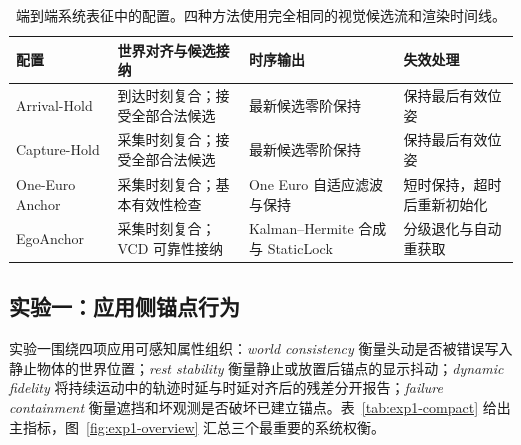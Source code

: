 \documentclass[9pt,twocolumn,letterpaper]{extarticle}
\begin{document}
\begin{table}[t]
\centering
\caption{端到端系统表征中的配置。四种方法使用完全相同的视觉候选流和渲染时间线。}
\label{tab:configs}
\small
\begin{tabularx}{\textwidth}{lXXX}
\toprule
配置 & 世界对齐与候选接纳 & 时序输出 & 失效处理 \\
\midrule
Arrival-Hold & 到达时刻复合；接受全部合法候选 & 最新候选零阶保持 & 保持最后有效位姿 \\
Capture-Hold & 采集时刻复合；接受全部合法候选 & 最新候选零阶保持 & 保持最后有效位姿 \\
One-Euro Anchor & 采集时刻复合；基本有效性检查 & One Euro 自适应滤波与保持 & 短时保持，超时后重新初始化 \\
EgoAnchor & 采集时刻复合；VCD 可靠性接纳 & Kalman--Hermite 合成与 StaticLock & 分级退化与自动重获取 \\
\bottomrule
\end{tabularx}
\end{table}

\subsection{实验一：应用侧锚点行为}

实验一围绕四项应用可感知属性组织：\emph{world consistency} 衡量头动是否被错误写入静止物体的世界位置；\emph{rest stability} 衡量静止或放置后锚点的显示抖动；\emph{dynamic fidelity} 将持续运动中的轨迹时延与时延对齐后的残差分开报告；\emph{failure containment} 衡量遮挡和坏观测是否破坏已建立锚点。表~\ref{tab:exp1-compact} 给出主指标，图~\ref{fig:exp1-overview} 汇总三个最重要的系统权衡。
\end{document}

